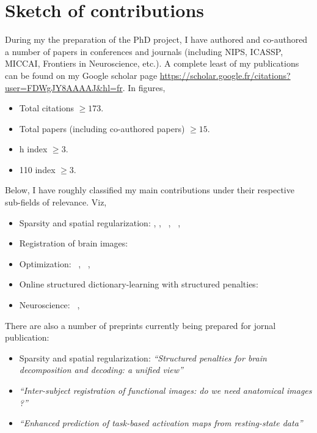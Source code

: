 \section{Sketch of contributions}
\label{sec:contrib}
During my the preparation of the PhD project, I  have authored and co-authored a number of papers in conferences and journals (including NIPS, ICASSP, MICCAI,
Frontiers in Neuroscience, etc.).
A complete least of my publications can be found on my Google scholar page \url{https://scholar.google.fr/citations?user=FDWgJY8AAAAJ&hl=fr}. In figures,
\begin{shaded}
\begin{itemize}
\item Total citations $\ge 173$.
  \item Total papers (including co-authored papers) $\ge 15$.
  \item h index $\ge 3$.
  \item 110 index $ \ge 3$.
  \end{itemize}
\end{shaded}  
Below, I  have roughly classified my main contributions under their respective sub-fields of relevance. Viz,
\begin{shaded}
\begin{itemize}
  \item{Sparsity and spatial regularization:}
     \citep{dohmatob2014benchmarking},  \citep{dohmatob2015speeding},
     ~\citep{abrahamregion},  ~\citep{eickenberg2015total},
     ~\citep{pelle2016multivariate}
  \item{Registration of brain images:}
    ~\citep{dohmatob2016epi2epi}
  \item{Optimization:}
     ~\citep{dohmatob2015local},  ~\citep{varoquaux2015faasta},  ~\citep{dohmatob2015simple}
  \item{Online structured dictionary-learning with structured penalties:}
     ~\citep{dohmatob2016}
  \item{Neuroscience:}
     ~\citep{rahim2015integrating},  ~\citep{thirion2014fmri}
\end{itemize}
\end{shaded}

There are also a number of preprints currently being prepared for jornal publication:

\begin{shaded}
\begin{itemize}
  \item{Sparsity and spatial regularization:}
     \textit{``Structured penalties for brain decomposition and decoding: a unified view''}
   \item \textit{``Inter-subject registration of functional images: do we need anatomical images ?''}
   \item \textit{``Enhanced prediction of task-based activation maps
     from resting-state data''}
\end{itemize}
\end{shaded}


